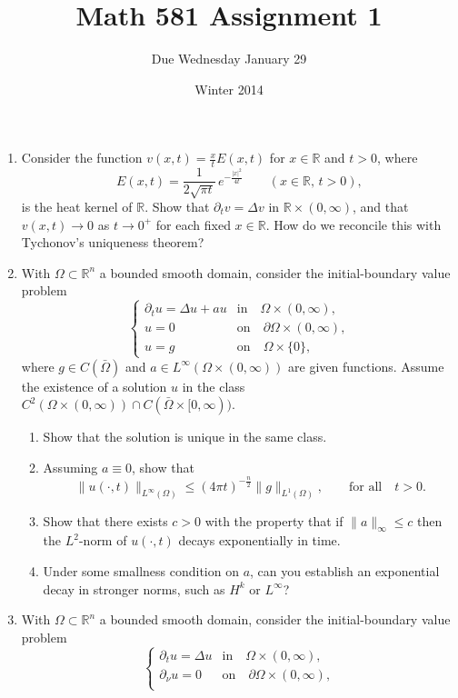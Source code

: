 \documentclass[11pt]{amsart}
\title{Math 581 Assignment 1}
\author{Due Wednesday January 29}
\date{Winter 2014}                                           %
\newcommand{\R}{\mathbb{R}}
\begin{document}
\maketitle

\begin{enumerate}[1.]
\item
Consider the function $v(x,t)=\frac{x}t E(x,t)$ for $x\in\R$ and $t>0$, where 
$$
E(x,t) = \frac1{2\sqrt{\pi t}} \, e^{-\frac{|x|^2}{4t}}
\qquad (x\in\R,\,t>0) ,
$$
is the heat kernel of $\R$.
Show that $\partial_t v = \Delta v$ in $\R\times(0,\infty)$, and that $v(x,t)\to0$ as $t\to0^+$ for each fixed $x\in\R$.
How do we reconcile this with Tychonov's uniqueness theorem?
\item
With $\Omega\subset\R^n$ a bounded smooth domain, consider the initial-boundary value problem
$$
\begin{cases}
\partial_t u = \Delta u + au &\textrm{in} \quad \Omega\times(0,\infty), \\
u = 0 &\textrm{on} \quad \partial\Omega\times(0,\infty), \\
u = g &\textrm{on} \quad \Omega\times\{0\},
\end{cases}
$$
where $g\in C(\bar\Omega)$ and $a\in L^\infty(\Omega\times(0,\infty))$ are given functions.
Assume the existence of a solution $u$ in the class $C^2(\Omega\times(0,\infty)) \cap C(\bar{\Omega}\times[0,\infty))$.
\begin{enumerate}
\item[a)]
Show that the solution is unique in the same class.
\item[b)]
Assuming $a\equiv0$, show that
$$
\|u(\cdot,t)\|_{L^\infty(\Omega)} \leq {(4\pi t)^{-\frac{n}2}} \|g\|_{L^1(\Omega)} ,
\qquad \textrm{for all}\quad t>0 .
$$
\item[c)]
Show that there exists $c>0$ with the property that if $\|a\|_{\infty}\leq c$ then the $L^2$-norm of $u(\cdot,t)$ decays exponentially in time.
\item[d)]
Under some smallness condition on $a$, can you establish an exponential decay in stronger norms, such as $H^k$ or $L^\infty$?
\end{enumerate}
\item
With $\Omega\subset\R^n$ a bounded smooth domain, consider the initial-boundary value problem
$$
\begin{cases}
\partial_t u = \Delta u &\textrm{in} \quad \Omega\times(0,\infty), \\
\partial_\nu u = 0 &\textrm{on} \quad \partial\Omega\times(0,\infty), \\

\end{cases}$$
\end{enumerate}
\end{document}
